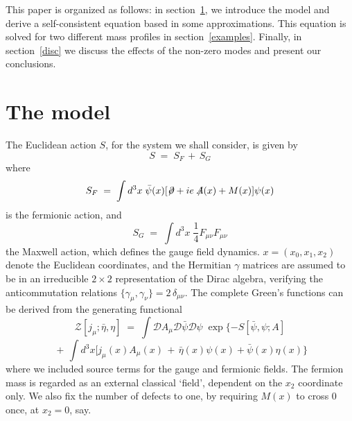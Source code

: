 \documentclass[a4paper,12pt]{article}
\begin{document}
This paper is organized as follows: in section~\ref{model}, we introduce
the model and derive a self-consistent equation based in some approximations.
This equation is solved for two different mass profiles in  
section~\ref{examples}. Finally, in section~\ref{disc} we discuss the 
effects of the non-zero modes and present our conclusions.

\section{The model}\label{model}
The Euclidean action $S$, for the system we shall consider, is given
by
\begin{equation}
   \label{dfaction}
S \;=\; S_F \,+\, S_G
\end{equation}
where
\begin{equation}
   \label{defsf}
S_F\;=\; \int d^3x \; \bar{\psi}(x) [\not \!\partial
+ i e \not \!\!A(x) + M(x) ] \psi(x)
\end{equation}
is the fermionic action, and
\begin{equation}
   \label{defsg}
S_G\;=\; \int d^3x \; \frac{1}{4}  F_{\mu \nu} F_{\mu \nu} 
\end{equation}
the Maxwell action, which defines the gauge field dynamics.
\mbox{$x=(x_0,x_1,x_2)$} denote the Euclidean coordinates, and the
Hermitian $\gamma$ matrices are assumed to be in an irreducible $2 \times 2$
representation of the Dirac algebra, verifying the anticommutation
relations $\{\gamma_{\mu},\gamma_{\nu}\}= 2\,\delta_{\mu\nu}$.
The complete Green's functions can be derived from the generating
functional
$$
{\mathcal Z}[j_\mu;{\bar \eta},\eta ]\;=\;\int {\mathcal D}A_\mu
{\mathcal D}{\bar \psi} {\mathcal D}\psi \; \exp \{- S[{\bar\psi},
\psi; A]
$$
\begin{equation}
   \label{defz}
\,+\, \int d^3x [ j_\mu(x) A_\mu(x)\,+\, {\bar\eta}(x)\psi(x)
+ {\bar\psi}(x)\eta(x) \}
\end{equation}
where we included source terms for the gauge and fermionic fields.
The fermion mass is regarded as an external classical `field',
dependent on the $x_2$ coordinate only. We also fix the number of
defects to one, by requiring $M(x)$ to cross $0$ once, at $x_2=0$,
say.
\end{document}
